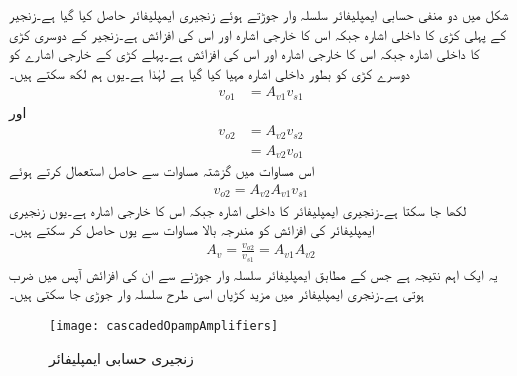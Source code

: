 شکل  میں دو منفی حسابی ایمپلیفائر سلسلہ وار جوڑتے ہوئے زنجیری ایمپلیفائر حاصل کیا گیا ہے۔زنجیر کے پہلی کڑی کا داخلی اشارہ  جبکہ اس کا خارجی اشارہ   اور اس کی افزائش  ہے۔زنجیر کے دوسری کڑی کا داخلی اشارہ   جبکہ اس کا خارجی اشارہ   اور اس کی افزائش  ہے۔پہلے کڑی کے خارجی اشارے کو دوسرے کڑی کو بطور داخلی اشارہ مہیا کیا گیا ہے لہٰذا  ہے۔یوں ہم لکھ سکتے ہیں۔
\begin{align*}
v_{o1}&=A_{v1} v_{s1}
\end{align*}
اور
\begin{align*}
v_{o2}&=A_{v2} v_{s2}\\
&=A_{v2} v_{o1}
\end{align*}
اس مساوات میں گزشتہ مساوات سے حاصل  استعمال کرتے ہوئے
\begin{align*}
v_{o2}=A_{v2} A_{v1} v_{s1}
\end{align*}
لکھا جا سکتا ہے۔زنجیری ایمپلیفائر کا داخلی اشارہ  جبکہ اس کا خارجی اشارہ  ہے۔یوں زنجیری ایمپلیفائر کی افزائش  کو مندرجہ بالا مساوات سے یوں حاصل کر سکتے ہیں۔
\begin{align}
A_v=\frac{v_{o2}}{v_{s1}}=A_{v1} A_{v2}
\end{align}
یہ ایک اہم نتیجہ ہے جس کے مطابق ایمپلیفائر سلسلہ وار جوڑنے سے ان کی افزائش آپس میں ضرب ہوتی ہے۔زنجری ایمپلیفائر میں مزید کڑیاں اسی طرح سلسلہ وار جوڑی جا سکتی ہیں۔
\begin{figure}
\centering
\texttt{[image: cascadedOpampAmplifiers]}
\caption{زنجیری حسابی ایمپلیفائر}
\label{شکل_حسابی_زنجیری}
\end{figure}


